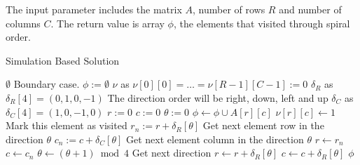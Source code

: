 The input parameter includes the matrix $A$, number of rows $R$ and number of columns $C$. The return value is array $\phi$, the elements that visited through spiral order.
\setcounter{algorithm}{0}
\begin{algorithm}[H]
\caption{Simulation Based Solution}
\begin{algorithmic}[1]
\State \Return $\emptyset$ \Comment Boundary case.
\EndIf
\State $\phi := \emptyset$
\State $\nu$ as $\nu[0][0] = \ldots  = \nu[R-1][C-1] := 0$
\State $\delta_R$ as $\delta_R[4] = (0, 1, 0, -1)$ \Comment The direction order will be right, down, left and up
\State $\delta_C$ as $\delta_C[4] = (1, 0, -1, 0)$
\State $r :=0$
\State $c :=0$
\State $\theta := 0$
\State $\phi \gets \phi \cup A[r][c]$
\State $\nu[r][c] \gets 1$ \Comment Mark this element as visited
\State $r_n := r + \delta_R[\theta]$ \Comment Get next element row in the direction $\theta$
\State $c_n := c + \delta_C[\theta]$ \Comment Get next element column in the direction $\theta$ 
\State $r\gets r_n$
\State $c\gets c_n$
\Else
\State $\theta \gets (\theta + 1) \bmod 4$ \Comment Get next direction
\State $r\gets r + \delta_R[\theta]$
\State $c\gets c + \delta_R[\theta]$
\EndIf
\State \Return $\phi$
\EndFor
\EndProcedure
\end{algorithmic}
\end{algorithm}
